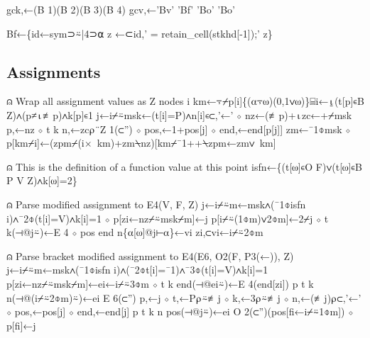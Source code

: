 \documentclass{article}%
\begin{document}
\nwenddocs{}\plusendmoddef\nwstartdeflinemarkup{}\nwenddeflinemarkup
gck,←(B 1)(B 2)(B 3)(B 4)
gcv,←'Bv' 'Bf' 'Bo' 'Bo'
\nwendcode{}\nwdocspar

\nwenddocs{}\plusendmoddef\nwstartdeflinemarkup{}\nwenddeflinemarkup
Bf←\{id←sym⊃⍨|4⊃⍺
        z ←⊂id,' = retain_cell(stkhd[-1]);'
z\}
\nwendcode{}\nwdocspar

\subsection{Assignments}

\nwenddocs{}\endmoddef\nwstartdeflinemarkup{}\nwenddeflinemarkup
⍝ Wrap all assignment values as Z nodes
i km←⍪⌿p[i]\{(⍺⍪⍵)(0,1∨⍵)\}⌸i←⍸(t[p]∊B Z)∧(p≠⍳≢p)∧k[p]∊1
j←i⌿⍨msk←(t[i]=P)∧n[i]∊⊂,'←' ⋄ nz←(≢p)+⍳zc←+⌿msk
p,←nz ⋄ t k n,←zc⍴¨Z 1(⊂'') ⋄ pos,←1+pos[j] ⋄ end,←end[p[j]]
zm←¯1⌽msk ⋄ p[km⌿i]←(zpm⌿(i×~km)+zm⍀nz)[km⌿¯1++⍀zpm←zm∨~km]

⍝ This is the definition of a function value at this point
isfn←\{(t[⍵]∊O F)∨(t[⍵]∊B P V Z)∧k[⍵]=2\}

⍝ Parse modified assignment to E4(V, F, Z)
j←i⌿⍨m←msk∧(¯1⌽isfn i)∧¯2⌽(t[i]=V)∧k[i]=1 ⋄ p[zi←nz⌿⍨msk⌿m]←j
p[i⌿⍨(1⌽m)∨2⌽m]←2⌿j ⋄ t k(⊣@j⍨)←E 4 ⋄ pos end n\{⍺[⍵]@j⊢⍺\}←vi zi,⊂vi←i⌿⍨2⌽m

⍝ Parse bracket modified assignment to E4(E6, O2(F, P3(←)), Z)
j←i⌿⍨m←msk∧(¯1⌽isfn i)∧(¯2⌽t[i]=¯1)∧¯3⌽(t[i]=V)∧k[i]=1
p[zi←nz⌿⍨msk⌿m]←ei←i⌿⍨3⌽m ⋄ t k end(⊣@ei⍨)←E 4(end[zi])
p t k n(⊣@(i⌿⍨2⌽m)⍨)←ei E 6(⊂'')
p,←j ⋄ t,←P⍴⍨≢j ⋄ k,←3⍴⍨≢j ⋄ n,←(≢j)⍴⊂,'←' ⋄ pos,←pos[j] ⋄ end,←end[j]
p t k n pos(⊣@j⍨)←ei O 2(⊂'')(pos[fi←i⌿⍨1⌽m]) ⋄ p[fi]←j
\end{document}
